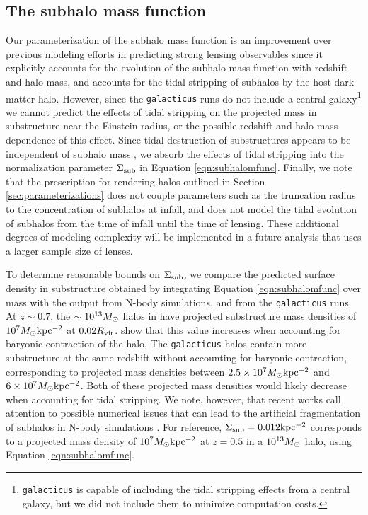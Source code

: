 \subsection{The subhalo mass function}
\label{ssec:submfuncassumptions}
Our parameterization of the subhalo mass function is an improvement over previous modeling efforts in predicting strong lensing observables since it explicitly accounts for the evolution of the subhalo mass function with redshift and halo mass, and accounts for the tidal stripping of subhalos by the host dark matter halo. However, since the {\tt{galacticus}} runs do not include a central galaxy\footnote{{\tt{galacticus}} is capable of including the tidal stripping effects from a central galaxy, but we did not include them to minimize computation costs.} we cannot predict the effects of tidal stripping on the projected mass in substructure near the Einstein radius, or the possible redshift and halo mass dependence of this effect. Since tidal destruction of substructures appears to be independent of subhalo mass \cite{GK++17,Graus++18}, we absorb the effects of tidal stripping into the normalization parameter $\Sigma_{\rm{sub}}$ in Equation \ref{eqn:subhalomfunc}. Finally, we note that the prescription for rendering halos outlined in Section \ref{sec:parameterizations} does not couple parameters such as the truncation radius to the concentration of subhalos at infall, and does not model the tidal evolution of subhalos from the time of infall until the time of lensing. These additional degrees of modeling complexity will be implemented in a future analysis that uses a larger sample size of lenses.

To determine reasonable bounds on $\Sigma_{\rm{sub}}$, we compare the predicted surface density in substructure obtained by integrating Equation \ref{eqn:subhalomfunc} over mass with the output from N-body simulations, and from the {\tt{galacticus}} runs. At $z \sim 0.7$, the $\sim 10^{13} {M_{\odot}}$ halos in \cite{Fiacconi++16} have projected substructure mass densities of $10^7 {M_{\odot}} \rm{kpc^{-2}}$ at $0.02 R_{\rm{vir}}$. \cite{Fiacconi++16} show that this value increases when accounting for baryonic contraction of the halo. The {\tt{galacticus}} halos contain more substructure at the same redshift without accounting for baryonic contraction, corresponding to projected mass densities between $2.5 \times 10^{7} {M_{\odot}} \rm{kpc^{-2}}$ and $6 \times 10^{7} {M_{\odot}} \rm{kpc^{-2}}$. Both of these projected mass densities would likely decrease when accounting for tidal stripping. We note, however, that recent works call attention to possible numerical issues that can lead to the artificial fragmentation of subhalos in N-body simulations \cite{vandenBosch++18,ErraniPenarrubia19}. For reference, $\Sigma_{\rm{sub}} = 0.012 \rm{kpc^{-2}}$ corresponds to a projected mass density of $10^{7}{M_{\odot}} \rm{kpc^{-2}}$ at $z=0.5$ in a $10^{13}{M_{\odot}}$ halo, using Equation \ref{eqn:subhalomfunc}. 


